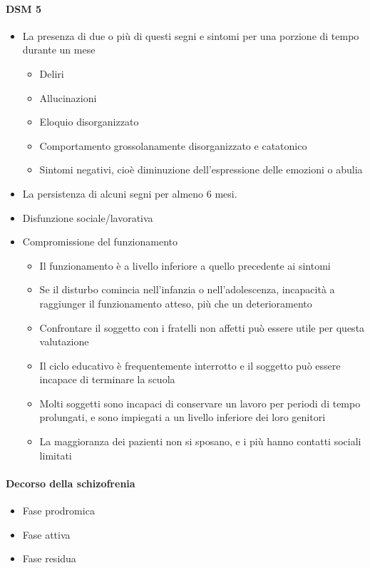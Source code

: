 \paragraph{DSM 5}  
\begin{itemize}
	\item La presenza di due o più di questi segni e sintomi per una porzione di tempo durante un mese
	\begin{itemize}
		\item Deliri
		\item Allucinazioni
		\item Eloquio disorganizzato
		\item Comportamento grossolanamente disorganizzato e catatonico
		\item Sintomi negativi, cioè diminuzione dell'espressione delle emozioni o abulia
	\end{itemize}
	\item La persistenza di alcuni segni per almeno 6 mesi.
	\item Disfunzione sociale/lavorativa 
	\item Compromissione del funzionamento
	\begin{itemize}
		\item Il funzionamento è a livello inferiore a quello precedente ai sintomi
		\item Se il disturbo comincia nell'infanzia o nell'adolescenza, incapacità a raggiunger il funzionamento atteso, più che un deterioramento 
		\item Confrontare il soggetto con i fratelli non affetti può essere utile per questa valutazione
		\item Il ciclo educativo è frequentemente interrotto e il soggetto può essere incapace di terminare la scuola
		\item Molti soggetti sono incapaci di conservare un lavoro per periodi di tempo prolungati, e sono impiegati a un livello inferiore dei loro genitori 
		\item La maggioranza dei pazienti non si sposano, e i più hanno contatti sociali limitati
	\end{itemize}

\end{itemize}
\paragraph{Decorso della schizofrenia}  
\begin{itemize}
	\item Fase prodromica
	\item Fase attiva
	\item Fase residua
\end{itemize}
